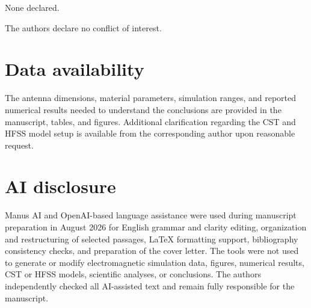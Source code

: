 \documentclass[USenglish]{article}
\begin{document}
\begin{funding}
None declared.
\end{funding}

\begin{conflictofinterest}
The authors declare no conflict of interest.
\end{conflictofinterest}

\section*{Data availability}
The antenna dimensions, material parameters, simulation ranges, and reported numerical results needed to understand the conclusions are provided in the manuscript, tables, and figures. Additional clarification regarding the CST and HFSS model setup is available from the corresponding author upon reasonable request.

\section*{AI disclosure}
Manus AI and OpenAI-based language assistance were used during manuscript preparation in August 2026 for English grammar and clarity editing, organization and restructuring of selected passages, LaTeX formatting support, bibliography consistency checks, and preparation of the cover letter. The tools were not used to generate or modify electromagnetic simulation data, figures, numerical results, CST or HFSS models, scientific analyses, or conclusions. The authors independently checked all AI-assisted text and remain fully responsible for the manuscript.



\end{document}
